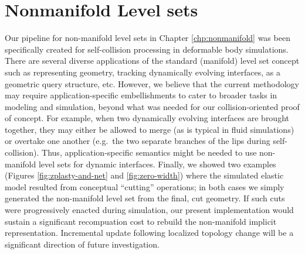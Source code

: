 \section{Nonmanifold Level sets}

Our pipeline for non-manifold level sets in Chapter
\ref{chp:nonmanifold} was been specifically created for self-collision
processing in deformable body simulations. There are several diverse
applications of the standard (manifold) level set concept such as
representing geometry, tracking dynamically evolving interfaces, as a
geometric query structure, etc. However, we believe that the current
methodology may require application-specific embellishments to cater
to broader tasks in modeling and simulation, beyond what was needed
for our collision-oriented proof of concept.  For example, when two
dynamically evolving interfaces are brought together, they may either
be allowed to merge (as is typical in fluid simulations) or overtake
one another (e.g.\ the two separate branches of the lips during
self-collision). Thus, application-specific semantics might be needed
to use non-manifold level sets for dynamic interfaces.  Finally, we
showed two examples (Figures \ref{fig:zplasty-and-net} and
\ref{fig:zero-width}) where the simulated elastic model resulted from
conceptual ``cutting'' operations; in both cases we simply generated
the non-manifold level set from the final, cut geometry. If such cuts
were progressively enacted during simulation, our present
implementation would sustain a significant recompuation cost to
rebuild the non-manifold implicit representation. Incremental update
following localized topology change will be a significant direction of
future investigation.

